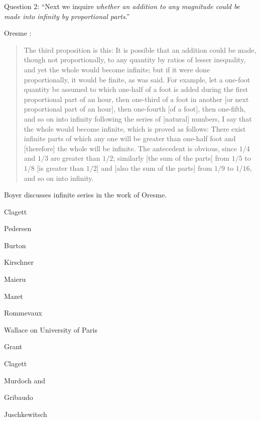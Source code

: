 \documentclass{article}
\theoremstyle{definition}
\begin{document}
Question 2: ``Next we inquire {\em whether an addition to any magnitude could be made into infinity by proportional parts}.''


Oresme \cite[p.~135]{grant1974}:
\begin{quote}
The third proposition is this: It is possible that an addition could be made, though not proportionally, to any quantity by ratios of lesser
inequality, and yet the whole would become infinite; but if it were done proportionally, it would be finite, as was said. For example, let a one-foot
quantity be assumed to which one-half of a foot is added during the first proportional part of an hour, then one-third of a foot in another [or next proportional
part of an hour], then one-fourth [of a foot], then one-fifth, and so on into infinity following the series of [natural] numbers, I say that the whole would become
infinite, which is proved as follows: There exist infinite parts of which any one will be greater than one-half foot and [therefore] the whole will be infinite. The antecedent is obvious, since
$1/4$ and $1/3$ are greater than $1/2$; similarly [the sum of the parts] from $1/5$ to $1/8$ [is greater than $1/2$] and [also the sum of the parts]
from $1/9$ to $1/16$, and so on into infinity.
\end{quote}



Boyer \cite[pp.~80--89]{boyer} discusses infinite series in the work of Oresme.

Clagett \cite{clagett1968}

Pedersen \cite[p.~199]{pedersen}

Burton \cite{burton}

Kirschner \cite{kirschner}

Maieru \cite{maieru}

Mazet \cite{mazet}

Rommevaux \cite{rommevaux}

Wallace \cite[pp.~65--116, Chapter 3]{wallace} on University of Paris

Grant \cite{proportionibus}

Clagett \cite{singleton}

Murdoch \cite{murdoch1975} and \cite{elkana}

Gribaudo \cite{gribaudo}

Juschkewitsch \cite[pp.~405--413]{juschkewitsch}



\end{document}
